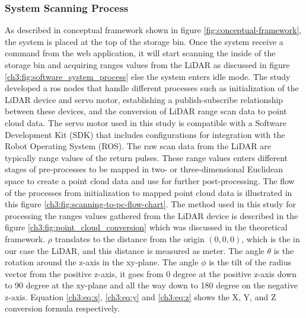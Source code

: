 \subsubsection{System Scanning Process}
As described in conceptual framework shown in figure \ref{fig:conceptual-framework}, the system is placed at the top of the storage bin. Once the system receive a command from the web application, it will start scanning the inside of the storage bin and acquiring ranges values from the LiDAR as discussed in figure \ref{ch3:fig:software_system_process} else the system enters idle mode. The study developed a ros nodes that handle different processes such as initialization of the LiDAR device and servo motor, establishing a publish-subscribe relationship between these devices, and the conversion of LiDAR range scan data to point cloud data. The servo motor used in this study is compatible with a Software Development Kit (SDK) that includes configurations for integration with the Robot Operating System (ROS). The raw scan data from the LiDAR are typically range values of the return pulses. These range values enters different stages of pre-processes to be mapped in two- or three-dimensional Euclidean space to create a point cloud data and use for further post-processing. The flow of the processes from initialization to mapped point cloud data is illustrated in this figure \ref{ch3:fig:scanning-to-pc-flow-chart}. The method used in this study for processing the ranges values gathered from the LiDAR device is described in the figure \ref{ch3:fig:point_cloud_conversion} which was discussed in the theoretical framework.  $\rho$ translates to the distance from the origin $(0,0,0)$, which is the in our case the LiDAR, and this distance is measured as meter. The angle $\theta$ is the rotation around the z-axis in the xy-plane. The angle $\phi$ is the tilt of the radius vector from the positive z-axis, it goes from 0 degree at the positive z-axis down to 90 degree at the xy-plane and all the way down to 180 degree on the negative z-axis. Equation \ref{ch3:eq:x}, \ref{ch3:eq:y} and \ref{ch3:eq:z} shows the X, Y, and Z conversion formula respectively.

